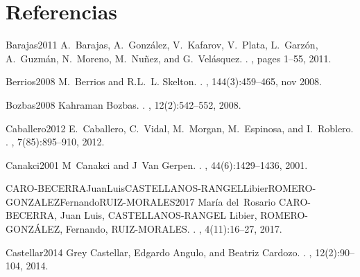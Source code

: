 \section*{Referencias}

\begin{description}

\item{Barajas2011}
A.~Barajas, A.~Gonz{\'{a}}lez, V.~Kafarov, V.~Plata, L.~Garz{\'{o}}n,
A.~Guzm{\'{a}}n, N.~Moreno, M.~Nu{\~{n}}ez, and G.~Vel{\'{a}}squez.
.
, pages 1--55, 2011.

\item{Berrios2008}
M.~Berrios and R.L.~L. Skelton.
.
, 144(3):459--465, nov 2008.

\item{Bozbas2008}
Kahraman Bozbas.
.
, 12(2):542--552, 2008.

\item{Caballero2012}
E.~Caballero, C.~Vidal, M.~Morgan, M.~Espinosa, and I.~Roblero.
.
, 7(85):895--910, 2012.

\item{Canakci2001}
M~Canakci and J~Van Gerpen.
.
, 44(6):1429--1436, 2001.

\item{CARO-BECERRAJuanLuisCASTELLANOS-RANGELLibierROMERO-GONZALEZFernandoRUIZ-MORALES2017}
Mar{\'{i}}a del~Rosario {CARO-BECERRA, Juan Luis, CASTELLANOS-RANGEL Libier,
	ROMERO-GONZ{\'{A}}LEZ, Fernando, RUIZ-MORALES}.
.
, 4(11):16--27,
2017.

\item{Castellar2014}
Grey Castellar, Edgardo Angulo, and Beatriz Cardozo.
.
, 12(2):90--104, 2014.


\end{description}
